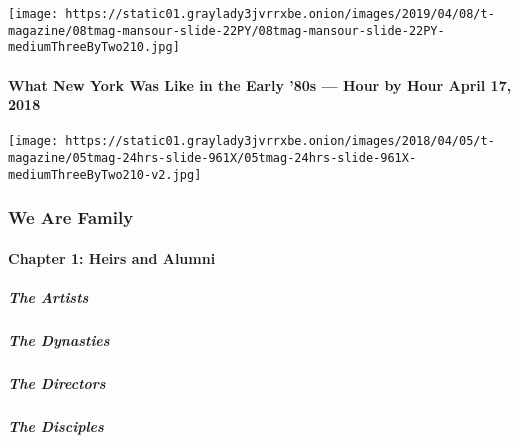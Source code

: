 \texttt{[image: https://static01.graylady3jvrrxbe.onion/images/2019/04/08/t-magazine/08tmag-mansour-slide-22PY/08tmag-mansour-slide-22PY-mediumThreeByTwo210.jpg]}
\href{https://www.nytimes3xbfgragh.onion/2018/04/17/t-magazine/24-hours-new-york-city-1980s-life.html}{}

\hypertarget{what-new-york-was-like-in-the-early-80s--hour-by-hour-april-17-2018}{%
\paragraph{What New York Was Like in the Early '80s --- Hour by Hour
April 17,
2018}\label{what-new-york-was-like-in-the-early-80s--hour-by-hour-april-17-2018}}

\texttt{[image: https://static01.graylady3jvrrxbe.onion/images/2018/04/05/t-magazine/05tmag-24hrs-slide-961X/05tmag-24hrs-slide-961X-mediumThreeByTwo210-v2.jpg]}

\hypertarget{we-are-family-1}{%
\subsubsection{We Are Family}\label{we-are-family-1}}

\hypertarget{chapter-1-heirs-and-alumni}{%
\paragraph{Chapter 1: Heirs and
Alumni}\label{chapter-1-heirs-and-alumni}}

\href{/interactive/2020/04/13/t-magazine/black-art-galleries.html}{}

\hypertarget{the-artists}{%
\subparagraph{The Artists}\label{the-artists}}

\href{/interactive/2020/04/13/t-magazine/italian-fashion-design-houses.html}{}

\hypertarget{the-dynasties}{%
\subparagraph{The Dynasties}\label{the-dynasties}}

\href{/interactive/2020/04/13/t-magazine/gordon-parks.html}{}

\hypertarget{the-directors}{%
\subparagraph{The Directors}\label{the-directors}}

\href{/interactive/2020/04/13/t-magazine/enrique-olvera-chef.html}{}

\hypertarget{the-disciples}{%
\subparagraph{The Disciples}\label{the-disciples}}

\href{/interactive/2020/04/13/t-magazine/royal-academy-antwerp.html}{}

